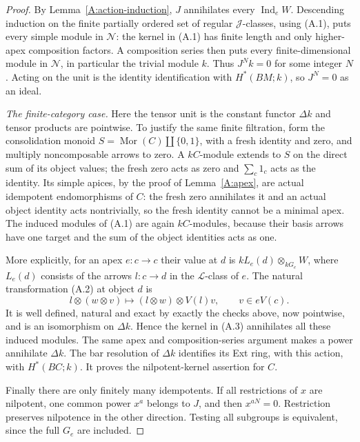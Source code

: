 \begin{proof}
By Lemma~\ref{A:action-induction}, $J$ annihilates every
$\operatorname{Ind}_eW$. Descending induction on the finite partially
ordered set of regular $\mathcal J$-classes, using (A.1), puts every simple
module in $\mathcal N$: the kernel in (A.1) has finite length and only
higher-apex composition factors. A composition series then puts every
finite-dimensional module in $\mathcal N$, in particular the trivial
module $k$. Thus $J^Nk=0$ for some integer $N$. Acting on the unit is the
identity identification with $H^*(BM;k)$, so $J^N=0$ as an ideal.

\emph{The finite-category case.}
Here the tensor unit is the constant functor $\Delta k$ and tensor products
are pointwise. To justify the same finite filtration, form the consolidation
monoid $S=\operatorname{Mor}(C)\amalg\{0,1\}$, with a fresh identity and
zero, and multiply noncomposable arrows to zero. A $kC$-module extends to
$S$ on the direct sum of its object values; the fresh zero acts as zero and
$\sum_c1_c$ acts as the identity. Its simple apices, by the proof of
Lemma~\ref{A:apex}, are actual idempotent endomorphisms of $C$: the fresh
zero annihilates it and an actual object identity acts nontrivially, so the
fresh identity cannot be a minimal apex. The induced modules of (A.1)
are again $kC$-modules, because their basis arrows have one target and the
sum of the object identities acts as one.

More explicitly, for an apex $e:c\to c$ their value at $d$ is
$kL_e(d)\otimes_{kG_e}W$, where $L_e(d)$ consists of the arrows
$l:c\to d$ in the $\mathcal L$-class of $e$. The natural transformation
(A.2) at object $d$ is
\[
 l\otimes(w\otimes v)\longmapsto(l\otimes w)\otimes V(l)v,
 \qquad v\in eV(c).
\]
It is well defined, natural and exact by exactly the checks above, now
pointwise, and is an isomorphism on $\Delta k$. Hence the kernel in (A.3)
annihilates all these induced modules. The same apex and composition-series
argument makes a power annihilate $\Delta k$. The bar resolution of
$\Delta k$ identifies its Ext ring, with this action, with $H^*(BC;k)$.
It proves the nilpotent-kernel assertion for $C$.

Finally there are only finitely many idempotents. If all restrictions of
$x$ are nilpotent, one common power $x^a$ belongs to $J$, and then
$x^{aN}=0$. Restriction preserves nilpotence in the other direction.
Testing all subgroups is equivalent, since the full $G_e$ are included.
\end{proof}

